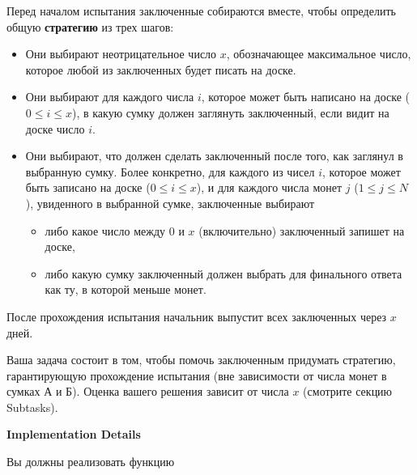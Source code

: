 Перед началом испытания заключенные собираются вместе, чтобы определить общую \textbf{стратегию} из трех шагов:
 \begin{itemize}
\item Они выбирают неотрицательное число $x$, обозначающее максимальное число, которое любой из заключенных будет писать на доске.
\item Они выбирают для каждого числа $i$, которое может быть написано на доске ($0 \le i \le x$), в какую сумку должен заглянуть заключенный, если видит на доске число $i$.
\item Они выбирают, что должен сделать заключенный после того, как заглянул в выбранную сумку. Более конкретно, для каждого из чисел $i$, которое может быть записано на доске ($0 \le i \le x$), и для каждого числа монет $j$ ($1 \le j \le N$), увиденного в выбранной сумке, заключенные выбирают
 \begin{itemize}
  \item либо какое число между $0$ и $x$ (включительно) заключенный запишет на доске,
  \item либо какую сумку заключенный должен выбрать для финального ответа как ту, в которой меньше монет.
 \end{itemize}
  \end{itemize}
После прохождения испытания начальник выпустит всех заключенных через $x$ дней.

Ваша задача состоит в том, чтобы помочь заключенным придумать стратегию, гарантирующую прохождение испытания (вне зависимости от числа монет в сумках А и Б). Оценка вашего решения зависит от числа $x$ (смотрите секцию Subtasks).


\textbf{Implementation Details}

Вы должны реализовать функцию


